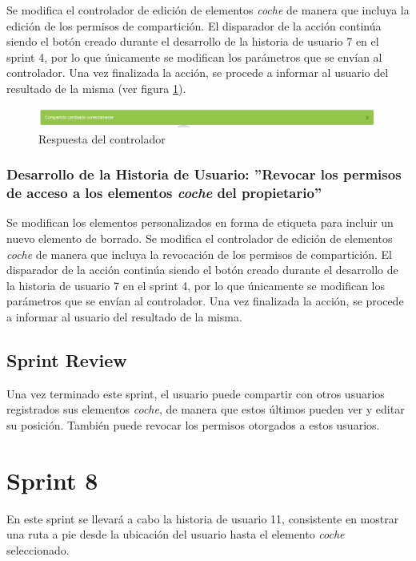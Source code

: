 	 Se modifica el controlador de edición de elementos \textit{coche} de manera que incluya la edición de los permisos de compartición.
	 El disparador de la acción continúa siendo el botón creado durante el desarrollo de la historia de usuario 7 en el sprint 4, por lo que únicamente se modifican los parámetros que se envían al controlador.
	 Una vez finalizada la acción, se procede a informar al usuario del resultado de la misma (ver figura \ref{fig:compartir_coche4}).
	 
	 \begin{figure}[H]
		\centering
		\includegraphics[width=15cm, fbox={\fboxrule} 4mm]{images/05-resultados/23-compartir_coche4.png}
		\caption{Respuesta del controlador}
		\label{fig:compartir_coche4}
	\end{figure}	

	\subsubsection{Desarrollo de la Historia de Usuario: ''Revocar los permisos de acceso a los elementos \textit{coche} del propietario''}	
	Se modifican los elementos personalizados en forma de etiqueta para incluir un nuevo elemento de borrado.
	Se modifica el controlador de edición de elementos \textit{coche} de manera que incluya la revocación de los permisos de compartición.
	El disparador de la acción continúa siendo el botón creado durante el desarrollo de la historia de usuario 7 en el sprint 4, por lo que únicamente se modifican los parámetros que se envían al controlador.
	 Una vez finalizada la acción, se procede a informar al usuario del resultado de la misma.
	
	\subsection{Sprint Review}
	Una vez terminado este sprint, el usuario puede compartir con otros usuarios registrados sus elementos \textit{coche}, de manera que estos últimos pueden ver y editar su posición. También puede revocar los permisos otorgados a estos usuarios.
	
\section{Sprint 8}
	En este sprint se llevará a cabo la historia de usuario 11, consistente en mostrar una ruta a pie desde la ubicación del usuario hasta el elemento \textit{coche} seleccionado.

